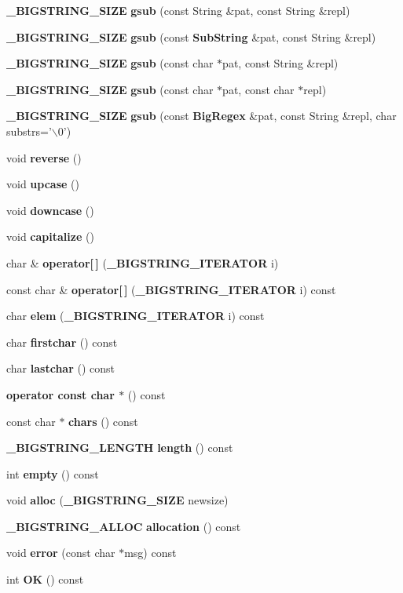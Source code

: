 \begin{CompactItemize}
\item 
{\bf \_\-BIGSTRING\_\-SIZE} {\bf gsub} (const String \&pat, const String \&repl)
\item 
{\bf \_\-BIGSTRING\_\-SIZE} {\bf gsub} (const {\bf Sub\-String} \&pat, const String \&repl)
\item 
{\bf \_\-BIGSTRING\_\-SIZE} {\bf gsub} (const char $\ast$pat, const String \&repl)
\item 
{\bf \_\-BIGSTRING\_\-SIZE} {\bf gsub} (const char $\ast$pat, const char $\ast$repl)
\item 
{\bf \_\-BIGSTRING\_\-SIZE} {\bf gsub} (const {\bf Big\-Regex} \&pat, const String \&repl, char substrs='$\backslash$0')
\item 
void {\bf reverse} ()
\item 
void {\bf upcase} ()
\item 
void {\bf downcase} ()
\item 
void {\bf capitalize} ()
\item 
char \& {\bf operator[$\,$]} ({\bf \_\-BIGSTRING\_\-ITERATOR} i)
\item 
const char \& {\bf operator[$\,$]} ({\bf \_\-BIGSTRING\_\-ITERATOR} i) const
\item 
char {\bf elem} ({\bf \_\-BIGSTRING\_\-ITERATOR} i) const
\item 
char {\bf firstchar} () const
\item 
char {\bf lastchar} () const
\item 
{\bf operator const char $\ast$} () const
\item 
const char $\ast$ {\bf chars} () const
\item 
{\bf \_\-BIGSTRING\_\-LENGTH} {\bf length} () const
\item 
int {\bf empty} () const
\item 
void {\bf alloc} ({\bf \_\-BIGSTRING\_\-SIZE} newsize)
\item 
{\bf \_\-BIGSTRING\_\-ALLOC} {\bf allocation} () const
\item 
void {\bf error} (const char $\ast$msg) const
\item 
int {\bf OK} () const
\end{CompactItemize}
